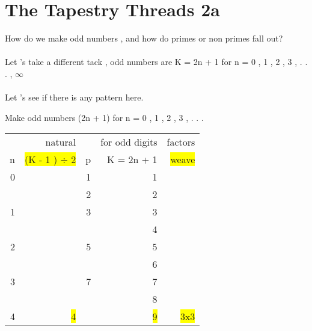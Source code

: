 \section{The Tapestry Threads 2a}
\normalfont
\normalsize
\par 
How do we make odd numbers , and how do primes or non primes fall out?
\\
\\
Let 's take a different tack , odd numbers are K  = 2n + 1 for n = 0 , 1 , 2 , 3 , . . . , $\infty$ 
\\
\\
Let 's see if there is any pattern here.
\pagebreak 

\small  
Make odd numbers (2n + 1) for n = 0 , 1 , 2 , 3 , . . . 
\\
\tiny
\begin{tabular}{|r|r|r|r|r|}
\hline        &      natural         &                  &  for odd digits   & factors     \\
                n &          \colorbox{yellow}{(K - 1 ) $\div$ 2}     &                p  &  K = 2n + 1   & \colorbox{yellow}{weave  }     \\
\hline               0               &                        &      1  &      1    &                                \\
\hline                              &                        &      2  &      2    &                                \\
\hline               1              &                        &      3  &      3    &                                \\
\hline                              &                        &         &      4    &                                \\
\hline               2              &                        &      5  &      5    &                                \\
\hline                              &                        &         &      6    &                                \\
\hline               3              &                        &      7  &      7    &                                \\
\hline                              &                        &         &      8    &                                \\
\hline               4              &   \colorbox{yellow}{4} &         &      \colorbox{yellow}{9}    &     \colorbox{yellow}{3x3  }   \\

\end{tabular}
